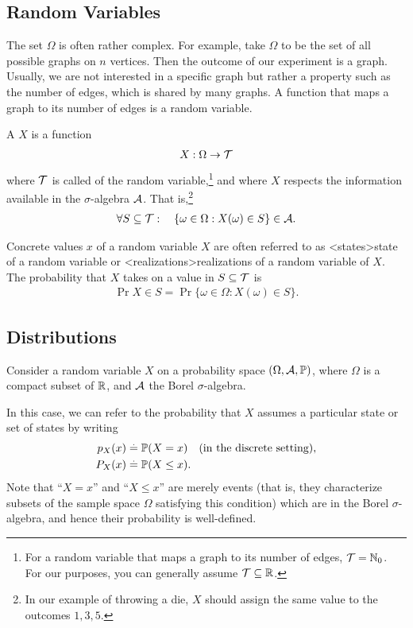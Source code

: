 \subsection{Random Variables}

The set $\Omega$ is often rather complex.
For example, take $\Omega$ to be the set of all possible graphs on $n$ vertices.
Then the outcome of our experiment is a graph.
Usually, we are not interested in a specific graph but rather a property such as the number of edges, which is shared by many graphs.
A function that maps a graph to its number of edges is a random variable.

\begin{defn}
  A  $X$ is a function \begin{align*}
    X : \Omega \to \mathcal{T}
  \end{align*} where $\mathcal{T}$ is called  of the random variable,\footnote{For a random variable that maps a graph to its number of edges, $\mathcal{T} = \mathbb{N}_0$. For our purposes, you can generally assume $\mathcal{T} \subseteq \mathbb{R}$.} and where $X$ respects the information available in the $\sigma$-algebra $\mathcal{A}$. That is,\footnote{In our example of throwing a die, $X$ should assign the same value to the outcomes $1,3,5$.} \begin{align}
    \forall S \subseteq \mathcal{T} :\quad \{\omega \in \Omega : X(\omega) \in S\} \in \mathcal{A}.
  \end{align}
\end{defn}

Concrete values $x$ of a random variable $X$ are often referred to as \midx<states>{state of a random variable} or \midx<realizations>{realizations of a random variable} of $X$.
The probability that $X$ takes on a value in $S \subseteq \mathcal{T}$ is \begin{align}
  \Pr{X \in S} = \Pr{\{\omega \in \Omega : X(\omega) \in S\}}.
\end{align}

\subsection{Distributions}

Consider a random variable $X$ on a probability space $(\Omega, \mathcal{A}, \mathbb{P})$, where $\Omega$ is a compact subset of $\mathbb{R}$, and $\mathcal{A}$ the Borel $\sigma$-algebra.

In this case, we can refer to the probability that $X$ assumes a particular state or set of states by writing
\begin{align}
  p_X(x) &\defeq \Pr{X = x} \quad \text{(in the discrete setting)}, \\
  P_X(x) &\defeq \Pr{X \leq x}.
\end{align}
Note that ``$X = x$'' and ``$X \leq x$'' are merely events (that is, they characterize subsets of the sample space $\Omega$ satisfying this condition) which are in the Borel $\sigma$-algebra, and hence their probability is well-defined.

